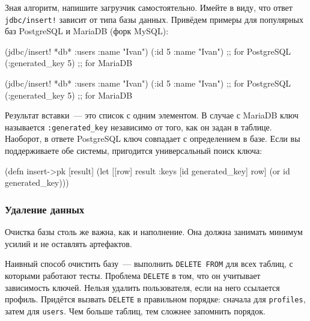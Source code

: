 
Зная алгоритм, напишите загрузчик самостоятельно. Имейте в виду, что ответ
\verb|jdbc/insert!| зависит от типа базы данных. Привёдем примеры для популярных
баз PostgreSQL и MariaDB (форк MySQL):

\ifnarrow

\begin{english}
  \begin{clojure}
(jdbc/insert! *db*
  :users {:name "Ivan"})
({:id 5 :name "Ivan"}) ;; for PostgreSQL
({:generated_key 5})   ;; for MariaDB
  \end{clojure}
\end{english}

\else

\begin{english}
  \begin{clojure}
(jdbc/insert! *db* :users {:name "Ivan"})
({:id 5 :name "Ivan"}) ;; for PostgreSQL
({:generated_key 5})   ;; for MariaDB
  \end{clojure}
\end{english}

\fi

Результат вставки~--- это список с одним элементом. В случае с MariaDB ключ
называется \verb|:generated_key| независимо от того, как он задан в
таблице. Наоборот, в ответе PostgreSQL ключ совпадает с определением в базе.
Если вы поддерживаете обе системы, пригодится универсальный поиск ключа:

\begin{english}
  \begin{clojure}
(defn insert->pk [result]
  (let [[row] result
        {:keys [id generated_key]} row]
    (or id generated_key)))
  \end{clojure}
\end{english}

\subsubsection*{Удаление данных}


Очистка базы столь же важна, как и наполнение. Она должна занимать минимум
усилий и не оставлять артефактов.

Наивный способ очистить базу~--- выполнить \verb|DELETE FROM| для всех
таблиц, с которыми работают тесты. Проблема \verb|DELETE| в том, что он
учитывает зависимость ключей. Нельзя удалить пользователя, если на него
ссылается профиль. Придётся вызвать \verb|DELETE| в правильном порядке:
сначала для \verb|profiles|, затем для \verb|users|. Чем больше таблиц, тем
сложнее запомнить порядок.

